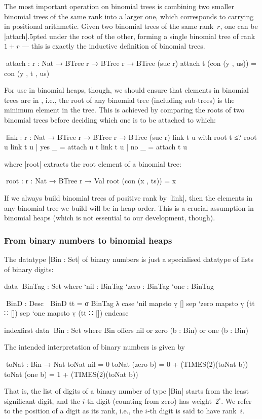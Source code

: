 The most important operation on binomial trees is combining two smaller binomial trees of the same rank into a larger one, which corresponds to carrying in positional arithmetic.
Given two binomial trees of the same rank~$r$, one can be |attach|{\kern.5pt}ed under the root of the other, forming a single binomial tree of rank $1+r$ --- this is exactly the inductive definition of binomial trees.
\begin{code}
^^^attach : {r : Nat} → BTree r → BTree r → BTree (suc r)
attach t (con (y , us)) = con (y , t , us)
\end{code}
For use in binomial heaps, though, we should ensure that elements in binomial trees are in , i.e., the root of any binomial tree (including sub-trees) is the minimum element in the tree.
This is achieved by comparing the roots of two binomial trees before deciding which one is to be attached to which:
\begin{code}
^^^link : {r : Nat} → BTree r → BTree r → BTree (suc r)
link t u with root t ≤? root u
link t u | yes  _ = attach u t
link t u | no   _ = attach t u
\end{code}
where |root| extracts the root element of a binomial tree:
\begin{code}
^^^root : {r : Nat} → BTree r → Val
root (con (x , ts)) = x
\end{code}
If we always build binomial trees of positive rank by |link|, then the elements in any binomial tree we build will be in heap order.
This is a crucial assumption in binomial heaps (which is not essential to our development, though).

\subsubsection{From binary numbers to binomial heaps}
The datatype |Bin : Set| of binary numbers is just a specialised datatype of lists of binary digits:
\begin{code}
data ^^^BinTag : Set where
  `nil   : BinTag
  `zero  : BinTag
  `one   : BinTag

^^^BinD : Desc ⊤
BinD tt = σ BinTag λ  case  `nil   mapsto  ṿ []
                      sep   `zero  mapsto  ṿ (tt ∷ [])
                      sep   `one   mapsto  ṿ (tt ∷ []) endcase

indexfirst data ^^^Bin : Set where
  Bin  offers  nil
       or      zero  (b : Bin)
       or      one   (b : Bin)
\end{code}
The intended interpretation of binary numbers is given by
\begin{code}
^^^toNat : Bin → Nat
toNat nil        = 0
toNat (zero  b)  = 0 + (TIMES(2)(toNat b))
toNat (one   b)  = 1 + (TIMES(2)(toNat b))
\end{code}
That is, the list of digits of a binary number of type |Bin| starts from the least significant digit, and the $i$-th digit (counting from zero) has weight~$2^i$.
We refer to the position of a digit as its rank, i.e., the $i$-th digit is said to have rank~$i$.


